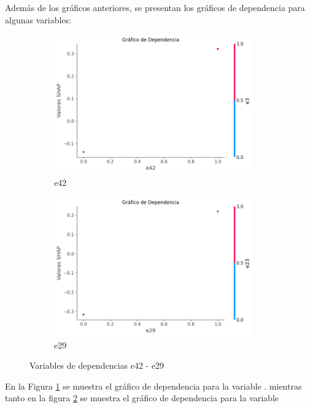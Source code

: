 Además de los gráficos anteriores, se presentan los gráficos de dependencia para algunas variables:

\begin{figure}[H]

    \begin{subfigure}{0.5\textwidth}
        \includegraphics[width=0.9\linewidth, height=6cm]{img/shap_lr/e42.png}
        \caption{e42}
        \label{fig:dependencia_e42_lr}
    \end{subfigure}
    \begin{subfigure}{0.5\textwidth}
        \includegraphics[width=0.9\linewidth, height=6cm]{img/shap_lr/e29.png}
        \caption{e29}
        \label{fig:dependencia_e29_lr}
    \end{subfigure}

    \caption{Variables de dependencias e42 - e29}
    \label{fig:image2}
\end{figure}

En la Figura \ref{fig:dependencia_e42_lr} se muestra el gráfico de dependencia para la variable . mientras tanto en la figura \ref{fig:dependencia_e29_lr} se muestra el gráfico de dependencia para la variable 

